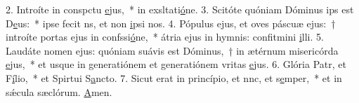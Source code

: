 2. Introíte in conspctu \uline{e}jus,~* in exsltati\uline{ó}ne.
3. Scitóte quóniam Dóminus ips est D\uline{e}us:~* ipse fecit ns, et non \uline{i}psi nos.
4. Pópulus ejus, et oves páscuæ ejus:~† introíte portas ejus in confssi\uline{ó}ne,~* átria ejus in hymnis: confitmini \uline{i}lli.
5. Laudáte nomen ejus: quóniam suávis est Dóminus,~† in ætérnum misericórda \uline{e}jus,~* et usque in generatiónem et generatiónem vritas \uline{e}jus.
6. Glória Patr, et F\uline{í}lio,~* et Spirtui S\uline{a}ncto.
7. Sicut erat in princípio, et nnc, et s\uline{e}mper,~* et in sǽcula sæclórum. \uline{A}men.
